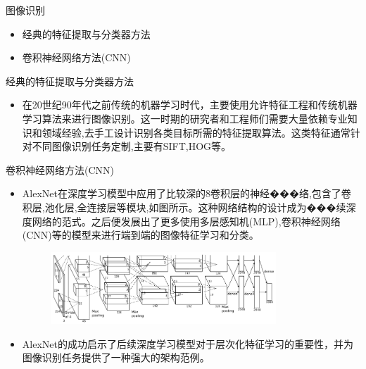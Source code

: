\documentclass[UTF8,AutoFakeBold,AutoFakeSlant]{beamer}
\begin{document}
\begin{frame}{图像识别}
    \begin{itemize}
        \item 经典的特征提取与分类器方法
        \item 卷积神经网络方法(CNN)

    \end{itemize}
\end{frame}

\begin{frame}{经典的特征提取与分类器方法}
    \begin{itemize}
        \item 在20世纪90年代之前传统的机器学习时代，主要使用允许特征工程和传统机器学习算法来进行图像识别。这一时期的研究者和工程师们需要大量依赖专业知识和领域经验,去手工设计识别各类目标所需的特征提取算法。这类特征通常针对不同图像识别任务定制,主要有SIFT,HOG等。
    \end{itemize}
\end{frame}

\begin{frame}{卷积神经网络方法(CNN)}
    \scriptsize
    \begin{itemize}
        \item AlexNet在深度学习模型中应用了比较深的8卷积层的神经���络,包含了卷积层,池化层,全连接层等模块,如图所示。这种网络结构的设计成为���续深度网络的范式。之后便发展出了更多使用多层感知机(MLP),卷积神经网络(CNN)等的模型来进行端到端的图像特征学习和分类。

              \begin{figure}[H]
                  \centering
                  \includegraphics[width=0.8\textwidth]{img/2-Image Recognition/4.jpg}
              \end{figure}

        \item AlexNet的成功启示了后续深度学习模型对于层次化特征学习的重要性，并为图像识别任务提供了一种强大的架构范例。
    \end{itemize}
\end{frame}
\end{document}
